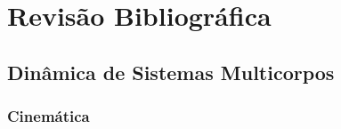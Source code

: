 \chapter{Revisão Bibliográfica}

% 

\lipsum[1-1]

\section{Dinâmica de Sistemas Multicorpos}

\subsection{Cinemática}\label{sec::cinematica}


